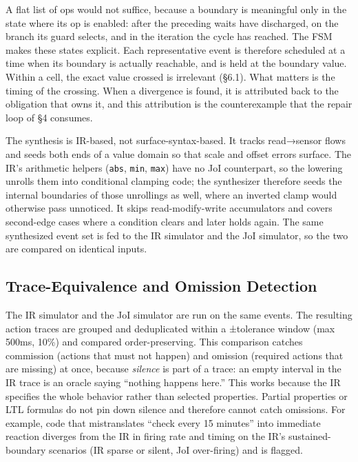 \documentclass[sigconf,nonacm,anonymous,review]{acmart}
\begin{document}
A flat list of ops would not suffice, because a boundary is meaningful only in the state where its op is enabled: after the preceding waits have discharged, on the branch its guard selects, and in the iteration the cycle has reached. The FSM makes these states explicit. Each representative event is therefore scheduled at a time when its boundary is actually reachable, and is held at the boundary value. Within a cell, the exact value crossed is irrelevant (\S6.1). What matters is the timing of the crossing. When a divergence is found, it is attributed back to the obligation that owns it, and this attribution is the counterexample that the repair loop of \S4 consumes.

The synthesis is IR-based, not surface-syntax-based. It tracks read→sensor flows and seeds both ends of a value domain so that scale and offset errors surface. The IR's arithmetic helpers (\texttt{abs}, \texttt{min}, \texttt{max}) have no JoI counterpart, so the lowering unrolls them into conditional clamping code; the synthesizer therefore seeds the internal boundaries of those unrollings as well, where an inverted clamp would otherwise pass unnoticed. It skips read-modify-write accumulators and covers second-edge cases where a condition clears and later holds again. The same synthesized event set is fed to the IR simulator and the JoI simulator, so the two are compared on identical inputs.

\subsection{Trace-Equivalence and Omission Detection}

The IR simulator and the JoI simulator are run on the same events. The resulting action traces are grouped and deduplicated within a ±tolerance window (max 500ms, 10\%) and compared order-preserving. This comparison catches commission (actions that must not happen) and omission (required actions that are missing) at once, because \emph{silence} is part of a trace: an empty interval in the IR trace is an oracle saying ``nothing happens here.'' This works because the IR specifies the whole behavior rather than selected properties. Partial properties or LTL formulas do not pin down silence and therefore cannot catch omissions. For example, code that mistranslates ``check every 15 minutes'' into immediate reaction diverges from the IR in firing rate and timing on the IR's sustained-boundary scenarios (IR sparse or silent, JoI over-firing) and is flagged.
\end{document}
